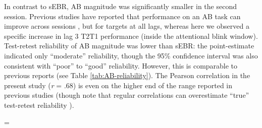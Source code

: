 \documentclass[11pt,english,]{memoir}
\begin{document}
In contrast to sEBR, AB magnitude was significantly smaller in the second session. Previous studies have reported that performance on an AB task can improve across sessions \autocites{Dale2013}{Slagter2007}, but for targets at all lags, whereas here we observed a specific increase in lag 3 T2\textbar{}T1 performance (inside the attentional blink window). Test-retest reliability of AB magnitude was lower than sEBR: the point-estimate indicated only ``moderate'' reliability, though the 95\% confidence interval was also consistent with ``poor'' to ``good'' reliability. However, this is comparable to previous reports (see Table \ref{tab:AB-reliability}). The Pearson correlation in the present study (\emph{r} = .68) is even on the higher end of the range reported in previous studies (though note that regular correlations can overestimate ``true'' test-retest reliability \autocite{Bland1986}).

\begingroup
\small

\LTcapwidth=\textwidth
\end{document}
